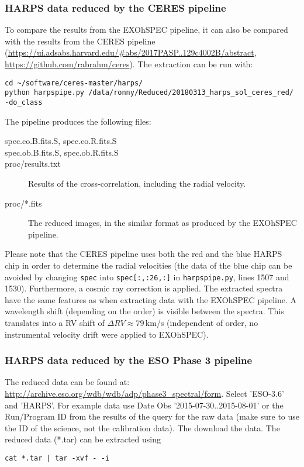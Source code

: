 \documentclass[10pt,a4paper]{article}
\begin{document}
\subsubsection{HARPS data reduced by the CERES pipeline}
To compare the results from the EXOhSPEC pipeline, it can also be compared with the results from the CERES pipeline (\url{https://ui.adsabs.harvard.edu/#abs/2017PASP..129c4002B/abstract}, \url{https://github.com/rabrahm/ceres}). The extraction can be run with:
\begin{lstlisting}[style=base]
cd ~/software/ceres-master/harps/
python harpspipe.py /data/ronny/Reduced/20180313_harps_sol_ceres_red/ -do_class
\end{lstlisting}

The pipeline produces the following files:
\begin{description}
  \item[spec.co.B.fits.S, spec.co.R.fits.S] 
  \item[spec.ob.B.fits.S, spec.ob.R.fits.S] 
  \item[proc/results.txt] Results of the cross-correlation, including the radial velocity.
  \item[proc/*.fits] The reduced images, in the similar format as produced by the EXOhSPEC pipeline.
\end{description}

Please note that the CERES pipeline uses both the red and the blue HARPS chip in order to determine the radial velocities (the data of the blue chip can be avoided by changing \verb|spec| into \verb|spec[:,:26,:]| in \verb|harpspipe.py|, lines 1507 and 1530). Furthermore, a cosmic ray correction is applied. The extracted spectra have the same features as when extracting data with the EXOhSPEC pipeline. A wavelength shift (depending on the order) is visible between the spectra. This translates into a RV shift of $\Delta RV \approx 79$\,km/s (independent of order, no instrumental velocity drift were applied to EXOhSPEC).



\subsubsection{HARPS data reduced by the ESO Phase 3 pipeline}
The reduced data can be found at: \url{http://archive.eso.org/wdb/wdb/adp/phase3_spectral/form}. Select 'ESO-3.6' and 'HARPS'. For example data use Date Obs '2015-07-30..2015-08-01' or the Run/Program ID from the results of the query for the raw data (make sure to use the ID of the science, not the calibration data). The download the data. The reduced data (*.tar) can be extracted using
\begin{lstlisting}[style=base]
cat *.tar | tar -xvf - -i
\end{lstlisting}
\end{document}
